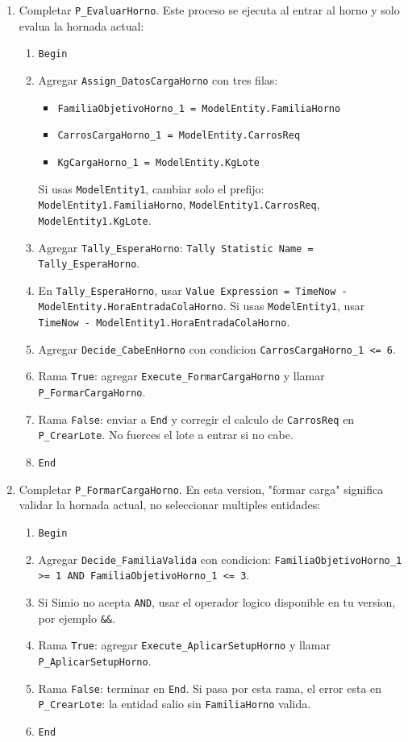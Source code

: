 \documentclass[11pt]{article}
\newcommand{\simio}[1]{\texttt{#1}}
\newcommand{\state}[1]{\texttt{#1}}
\newcommand{\proc}[1]{\texttt{#1}}
\begin{document}
\begin{enumerate}
  \item Completar \proc{P\_EvaluarHorno}. Este proceso se ejecuta al entrar al horno y solo evalua la hornada actual:
  \begin{enumerate}
    \item \simio{Begin}
    \item Agregar \simio{Assign\_DatosCargaHorno} con tres filas:
    \begin{itemize}
      \item \state{FamiliaObjetivoHorno\_1 = ModelEntity.FamiliaHorno}
      \item \state{CarrosCargaHorno\_1 = ModelEntity.CarrosReq}
      \item \state{KgCargaHorno\_1 = ModelEntity.KgLote}
    \end{itemize}
    Si usas \simio{ModelEntity1}, cambiar solo el prefijo: \state{ModelEntity1.FamiliaHorno}, \state{ModelEntity1.CarrosReq}, \state{ModelEntity1.KgLote}.
    \item Agregar \simio{Tally\_EsperaHorno}: \simio{Tally Statistic Name = Tally\_EsperaHorno}.
    \item En \simio{Tally\_EsperaHorno}, usar \simio{Value Expression = TimeNow - ModelEntity.HoraEntradaColaHorno}. Si usas \simio{ModelEntity1}, usar \state{TimeNow - ModelEntity1.HoraEntradaColaHorno}.
    \item Agregar \simio{Decide\_CabeEnHorno} con condicion \state{CarrosCargaHorno\_1 <= 6}.
    \item Rama \simio{True}: agregar \simio{Execute\_FormarCargaHorno} y llamar \proc{P\_FormarCargaHorno}.
    \item Rama \simio{False}: enviar a \simio{End} y corregir el calculo de \state{CarrosReq} en \proc{P\_CrearLote}. No fuerces el lote a entrar si no cabe.
    \item \simio{End}
  \end{enumerate}

  \item Completar \proc{P\_FormarCargaHorno}. En esta version, "formar carga" significa validar la hornada actual, no seleccionar multiples entidades:
  \begin{enumerate}
    \item \simio{Begin}
    \item Agregar \simio{Decide\_FamiliaValida} con condicion: \state{FamiliaObjetivoHorno\_1 >= 1 AND FamiliaObjetivoHorno\_1 <= 3}.
    \item Si Simio no acepta \state{AND}, usar el operador logico disponible en tu version, por ejemplo \state{\&\&}.
    \item Rama \simio{True}: agregar \simio{Execute\_AplicarSetupHorno} y llamar \proc{P\_AplicarSetupHorno}.
    \item Rama \simio{False}: terminar en \simio{End}. Si pasa por esta rama, el error esta en \proc{P\_CrearLote}: la entidad salio sin \state{FamiliaHorno} valida.
    \item \simio{End}
  \end{enumerate}


\end{enumerate}
\end{document}
